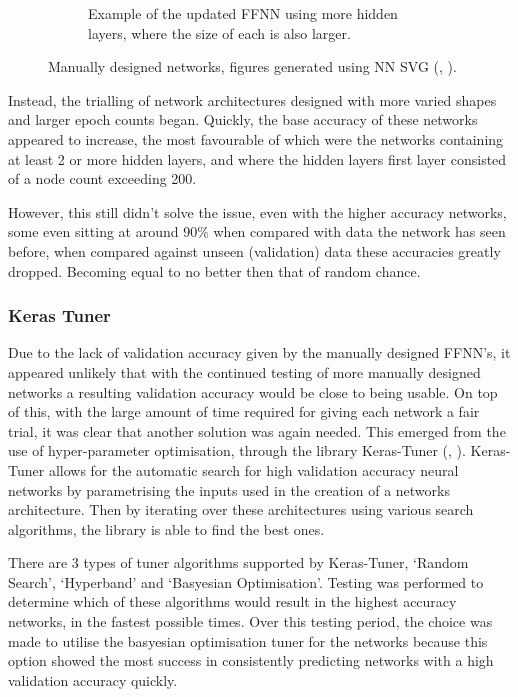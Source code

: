 \documentclass[11pt, a4paper]{article}
\newcommand{\ccite}[1]{(\citeauthor{#1}, \citeyear{#1})}
\begin{document}
\begin{figure}[H]
\begin{subfigure}[t]{0.45\linewidth}
		\captionsetup{font = small, labelfont = small, width=.8\linewidth}
		\caption{Example of the updated FFNN using more hidden layers, where the size of each is also larger.}
		\label{fig:ffnn_:_200_node_layer_motor_imagery}
	\end{subfigure}
	\captionsetup{font = small, labelfont = small, width=.8\linewidth}
	\caption{Manually designed networks, figures generated using NN SVG \ccite{LeNail2019}.}
	\label{fig:ffnn_:_networks}
\end{figure}


Instead, the trialling of network architectures designed with more varied shapes and larger epoch counts began. Quickly, the base accuracy of these networks appeared to increase, the most favourable of which were the networks containing at least 2 or more hidden layers, and where the hidden layers first layer consisted of a node count exceeding 200.

\hfill

However, this still didn't solve the issue, even with the higher accuracy networks, some even sitting at around 90\% when compared with data the network has seen before, when compared against unseen (validation) data these accuracies greatly dropped. Becoming equal to no better then that of random chance. 


\subsubsection{Keras Tuner}

Due to the lack of validation accuracy given by the manually designed FFNN's, it appeared unlikely that with the continued testing of more manually designed networks a resulting validation accuracy would be close to being usable. On top of this, with the large amount of time required for giving each network a fair trial, it was clear that another solution was again needed. This emerged from the use of hyper-parameter optimisation, through the library Keras-Tuner \ccite{omalley2019kerastuner}. Keras-Tuner allows for the automatic search for high validation accuracy neural networks by parametrising the inputs used in the creation of a networks architecture. Then by iterating over these architectures using various search algorithms, the library is able to find the best ones. 

\hfill

There are 3 types of tuner algorithms supported by Keras-Tuner, `Random Search', `Hyperband' and `Basyesian Optimisation'. Testing was performed to determine which of these algorithms would result in the highest accuracy networks, in the fastest possible times. Over this testing period, the choice was made to utilise the basyesian optimisation tuner for the networks because this option showed the most success in consistently predicting networks with a high validation accuracy quickly.
\end{document}
